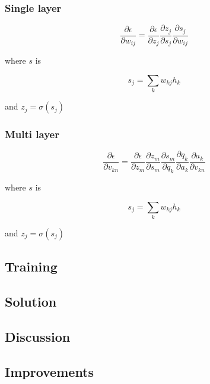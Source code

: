\documentclass{IEEEtran}
\begin{document}
\subsubsection{Single layer}
\begin{equation}
  \frac{\partial \epsilon}{\partial w_{ij}} =
  \frac{\partial \epsilon}{\partial z_j}
  \frac{\partial z_j}{\partial s_j}
  \frac{\partial s_j}{\partial w_{ij}}
\end{equation}

where $s$ is

\begin{equation}
  s_j = \sum_{k}{w_{kj}h_k}
\end{equation}

and $z_j = \sigma(s_j)$

\subsubsection{Multi layer}
\begin{equation}
  \frac{\partial \epsilon}{\partial v_{kn}} =
  \frac{\partial \epsilon}{\partial z_m}
  \frac{\partial z_m}{\partial s_m}
  \frac{\partial s_m}{\partial q_k}
  \frac{\partial q_k}{\partial a_k}
  \frac{\partial a_k}{\partial v_{kn}}
\end{equation}

where $s$ is

\begin{equation}
  s_j = \sum_{k}{w_{kj}h_k}
\end{equation}

and $z_j = \sigma(s_j)$

\subsection{Training}

\subsection{Solution}

\subsection{Discussion}

\subsection{Improvements}
\end{document}
